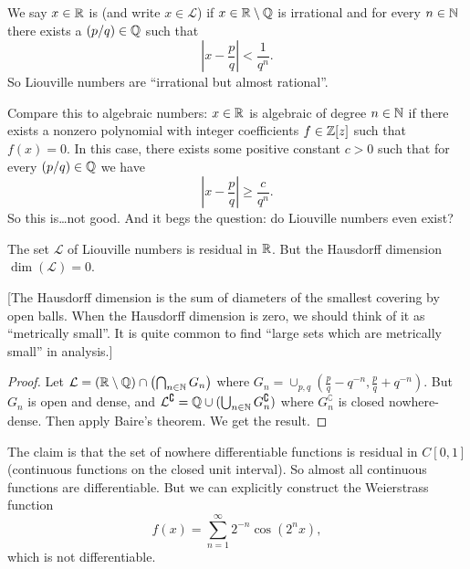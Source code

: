 \begin{example}
We say $x\in\mathbb{R}$ is  (and write $x\in\mathcal{L}$)
if $x\in\mathbb{R}\setminus\mathbb{Q}$ is irrational and for every $n\in\mathbb{N}$ there
exists a $(p/q)\in\mathbb{Q}$ such that
\begin{equation}
\left|x-\frac{p}{q}\right|<\frac{1}{q^{n}}.
\end{equation}
So Liouville numbers are ``irrational but almost rational''.

Compare this to algebraic numbers: $x\in\mathbb{R}$ is algebraic of degree
$n\in\mathbb{N}$ if there
exists a nonzero polynomial with integer coefficients $f\in\mathbb{Z}[z]$
such that $f(x)=0$. In this case, there exists some positive constant
$c>0$ such that for every $(p/q)\in\mathbb{Q}$ we have
\begin{equation}
\left|x-\frac{p}{q}\right|\geq\frac{c}{q^{n}}.
\end{equation}
So this is\dots not good. And it begs the question: do Liouville
numbers even exist?
\end{example}

\begin{theorem}
The set $\mathcal{L}$ of Liouville numbers is residual in $\mathbb{R}$.
But the Hausdorff dimension $\dim(\mathcal{L})=0$.
\end{theorem}

[The Hausdorff dimension is the sum of diameters of the smallest
  covering by open balls. When the Hausdorff dimension is zero, we
  should think of it as ``metrically small''. It is quite common to
  find ``large sets which are metrically small'' in analysis.]

\begin{proof}
Let $\mathcal{L}=(\mathbb{R}\setminus\mathbb{Q})\cap\left(\bigcap_{n\in\mathbb{N}}G_{n}\right)$
where $G_{n}=\cup_{p,q}(\frac{p}{q}-q^{-n},\frac{p}{q}+q^{-n})$. But
$G_{n}$ is open and dense, and
$\mathcal{L}^{\complement}=\mathbb{Q}\cup(\bigcup_{n\in\mathbb{N}}G_{n}^{\complement})$
where $G_{n}^{\complement}$ is closed nowhere-dense. Then apply
Baire's theorem. We get the result.
\end{proof}

\begin{example}
The claim is that the  set of nowhere differentiable functions is
residual in $C[0,1]$ (continuous functions on the closed unit interval).
So almost all continuous functions are differentiable. But we can
explicitly construct the Weierstrass function
\begin{equation}
f(x)=\sum^{\infty}_{n=1}2^{-n}\cos(2^{n}x),
\end{equation}
which is not differentiable.
\end{example}

